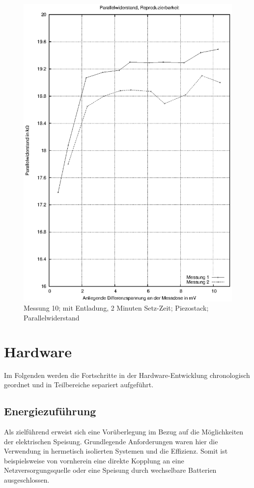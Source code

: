 \documentclass[12pt]{scrreprt} %
\begin{document}
\begin {figure}[htbp]
      \begin{center}
        \includegraphics{tabelle2_2_5}
      \end{center}
\caption{Messung 10; mit Entladung, 2 Minuten Setz-Zeit; Piezostack; Parallelwiderstand}
\label{fig:2.10}
\end{figure}
%
\chapter{Hardware}
Im Folgenden werden die Fortschritte in der Hardware-Entwicklung chronologisch geordnet und in Teilbereiche separiert aufgeführt.
\section{Energiezuführung}
Als zielführend erweist sich eine Vorüberlegung im Bezug auf die Möglichkeiten der elektrischen Speisung. Grundlegende Anforderungen waren hier die Verwendung in hermetisch isolierten Systemen und die Effizienz. Somit ist beispielsweise von vornherein eine direkte Kopplung an eine Netzversorgungsquelle oder eine Speisung durch wechselbare Batterien ausgeschlossen. 
\end{document}
